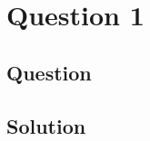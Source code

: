 \documentclass[11pt]{article}
\begin{document}
\section*{Question 1}
\subsection*{Question}
\subsection*{Solution}
\end{document}
